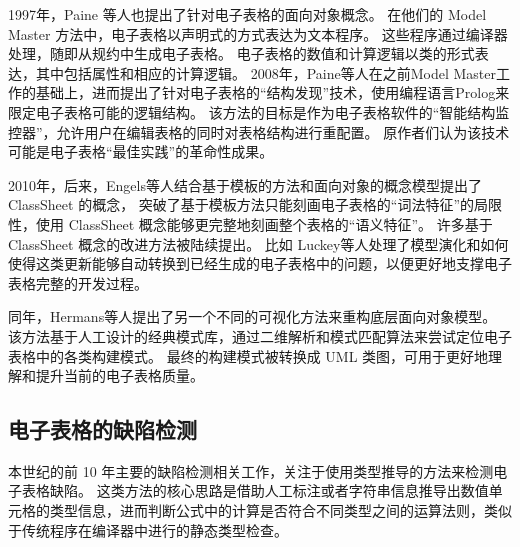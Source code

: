 1997年，Paine 等人\cite{ireson1997model,paine2008ensuring,paine2005bringing,paine2008rapid}也提出了针对电子表格的面向对象概念。
在他们的 Model Master 方法中，电子表格以声明式的方式表达为文本程序。
这些程序通过编译器处理，随即从规约中生成电子表格。
电子表格的数值和计算逻辑以类的形式表达，其中包括属性和相应的计算逻辑。
2008年，Paine等人\cite{paine2008spreadsheet}在之前Model Master工作的基础上，进而提出了针对电子表格的“结构发现”技术，使用编程语言Prolog来限定电子表格可能的逻辑结构。
该方法的目标是作为电子表格软件的“智能结构监控器”，允许用户在编辑表格的同时对表格结构进行重配置。
原作者们认为该技术可能是电子表格“最佳实践”的革命性成果。






2010年，后来，Engels等人\cite{engels2005classsheets,cunha2010automatically}结合基于模板的方法和面向对象的概念模型提出了 ClassSheet 的概念，
突破了基于模板方法只能刻画电子表格的“词法特征”的局限性，使用 ClassSheet 概念能够更完整地刻画整个表格的“语义特征”。
许多基于 ClassSheet 概念的改进方法被陆续提出\cite{luckey2012systematic,cunha2011type,cunha2011embedding,cunha2012bidirectional}。
比如 Luckey等人\cite{luckey2012systematic}处理了模型演化和如何使得这类更新能够自动转换到已经生成的电子表格中的问题，以便更好地支撑电子表格完整的开发过程。

同年，Hermans等人\cite{hermans2010automatically}提出了另一个不同的可视化方法来重构底层面向对象模型。
该方法基于人工设计的经典模式库，通过二维解析和模式匹配算法来尝试定位电子表格中的各类构建模式。
最终的构建模式被转换成 UML 类图，可用于更好地理解和提升当前的电子表格质量。


\subsection{电子表格的缺陷检测}
本世纪的前 10 年主要的缺陷检测相关工作，关注于使用类型推导的方法\cite{erwig2002adding,burnett2002testing,ahmad2003type,abraham2004header,abraham2006type,abraham2007ucheck,antoniu2004validating,chambers2009automatic,chambers2010reasoning}来检测电子表格缺陷。
这类方法的核心思路是借助人工标注或者字符串信息推导出数值单元格的类型信息，进而判断公式中的计算是否符合不同类型之间的运算法则，类似于传统程序在编译器中进行的静态类型检查。

